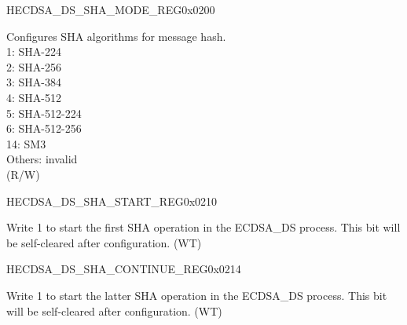 \begin{register}{H}{ECDSA\_DS\_SHA\_MODE\_REG}{0x0200}\label{regdesc:ECDSADSSHAMODEREG}
%
%
\regnewline%
\begin{regdesc}\begin{reglist}
\label{fielddesc:ECDSADSSHAMODE}\item [ECDSA\_DS\_SHA\_MODE] Configures SHA algorithms for message hash. \\
1: SHA-224\\
2: SHA-256\\
3: SHA-384\\
4: SHA-512\\
5: SHA-512-224\\
6: SHA-512-256\\
14: SM3\\
Others: invalid\\
(R/W)
\end{reglist}\end{regdesc}
\end{register}


\begin{register}{H}{ECDSA\_DS\_SHA\_START\_REG}{0x0210}\label{regdesc:ECDSADSSHASTARTREG}
%
%
\regnewline%
\begin{regdesc}\begin{reglist}
\label{fielddesc:ECDSADSSHASTART}\item [ECDSA\_DS\_SHA\_START] Write 1 to start the first SHA operation in the ECDSA\_DS process. This bit will be self-cleared after configuration. (WT)
\end{reglist}\end{regdesc}
\end{register}


\begin{register}{H}{ECDSA\_DS\_SHA\_CONTINUE\_REG}{0x0214}\label{regdesc:ECDSADSSHACONTINUEREG}
%
%
\regnewline%
\begin{regdesc}\begin{reglist}
\label{fielddesc:ECDSADSSHACONTINUE}\item [ECDSA\_DS\_SHA\_CONTINUE] Write 1 to start the latter SHA operation in the ECDSA\_DS process. This bit will be self-cleared after configuration. (WT)
\end{reglist}\end{regdesc}
\end{register}


